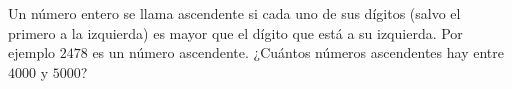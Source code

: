 Un número entero se llama ascendente si cada uno de sus dígitos (salvo el primero a la izquierda) es mayor que el dígito que está a su izquierda. Por ejemplo $2478$ es un número ascendente. ¿Cuántos números ascendentes hay entre $4000$ y $5000$?